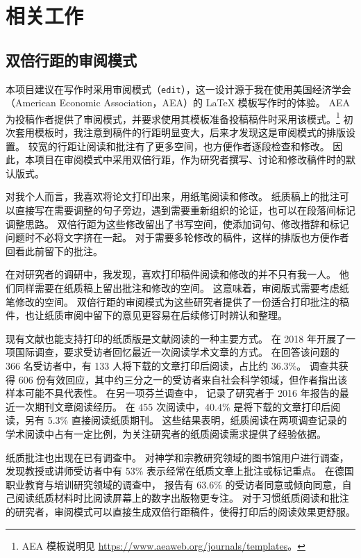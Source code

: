 \section{相关工作}
\label{sec:works}

\subsection{双倍行距的审阅模式}
本项目建议在写作时采用审阅模式（\texttt{edit}），这一设计源于我在使用美国经济学会（American Economic Association，AEA）的 \LaTeX{} 模板写作时的体验。
AEA 为投稿作者提供了审阅模式，并要求使用其模板准备投稿稿件时采用该模式。\footnote{AEA 模板说明见 \url{https://www.aeaweb.org/journals/templates}。}
初次套用模板时，我注意到稿件的行距明显变大，后来才发现这是审阅模式的排版设置。
较宽的行距让阅读和批注有了更多空间，也方便作者逐段检查和修改。
因此，本项目在审阅模式中采用双倍行距，作为研究者撰写、讨论和修改稿件时的默认版式。

对我个人而言，我喜欢将论文打印出来，用纸笔阅读和修改。
纸质稿上的批注可以直接写在需要调整的句子旁边，遇到需要重新组织的论证，也可以在段落间标记调整思路。
双倍行距为这些修改留出了书写空间，使添加词句、修改措辞和标记问题时不必将文字挤在一起。
对于需要多轮修改的稿件，这样的排版也方便作者回看此前留下的批注。

在对研究者的调研中，我发现，喜欢打印稿件阅读和修改的并不只有我一人。
他们同样需要在纸质稿上留出批注和修改的空间。
这意味着，审阅版式需要考虑纸笔修改的空间。
双倍行距的审阅模式为这些研究者提供了一份适合打印批注的稿件，也让纸质审阅中留下的意见更容易在后续修订时辨认和整理。

现有文献也能支持打印的纸质版是文献阅读的一种主要方式。
\textcite{tenopir_international_2019} 在 2018 年开展了一项国际调查，要求受访者回忆最近一次阅读学术文章的方式。
在回答该问题的 366 名受访者中，有 133 人将下载的文章打印后阅读，占比约 36.3\%。
调查共获得 606 份有效回应，其中约三分之一的受访者来自社会科学领域，但作者指出该样本可能不具代表性。
在另一项芬兰调查中，\textcite{tenopir_finland_2019} 记录了研究者于 2016 年报告的最近一次期刊文章阅读经历。
在 455 次阅读中，40.4\% 是将下载的文章打印后阅读，另有 5.3\% 直接阅读纸质期刊。
这些结果表明，纸质阅读在两项调查记录的学术阅读中占有一定比例，为关注研究者的纸质阅读需求提供了经验依据。

纸质批注也出现在已有调查中。
\textcite{lincoln_reading_2013} 对神学和宗教研究领域的图书馆用户进行调查，发现教授或讲师受访者中有 53\% 表示经常在纸质文章上批注或标记重点。
在德国职业教育与培训研究领域的调查中，\textcite{getz_researchers_2021} 报告有 63.6\% 的受访者同意或倾向同意，自己阅读纸质材料时比阅读屏幕上的数字出版物更专注。
对于习惯纸质阅读和批注的研究者，审阅模式可以直接生成双倍行距稿件，使得打印后的阅读效果更舒服。

